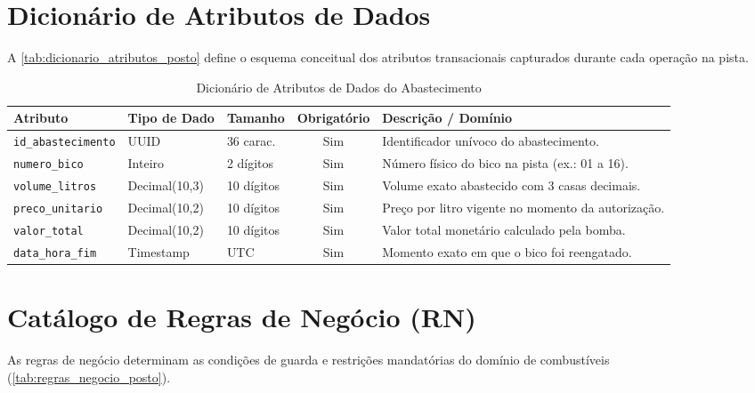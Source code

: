 \section{Dicionário de Atributos de Dados}

A \autoref{tab:dicionario_atributos_posto} define o esquema conceitual dos atributos transacionais capturados durante cada operação na pista.

\begin{table}[htbp]
\caption{Dicionário de Atributos de Dados do Abastecimento}
\label{tab:dicionario_atributos_posto}
\centering
\small
\begin{tabularx}{\textwidth}{@{} l l l c Y @{}}
\toprule
\textbf{Atributo} & \textbf{Tipo de Dado} & \textbf{Tamanho} & \textbf{Obrigatório} & \textbf{Descrição / Domínio} \\
\midrule
\texttt{id\_abastecimento} & UUID & 36 carac. & Sim & Identificador unívoco do abastecimento. \\
\texttt{numero\_bico} & Inteiro & 2 dígitos & Sim & Número físico do bico na pista (ex.: 01 a 16). \\
\texttt{volume\_litros} & Decimal(10,3) & 10 dígitos & Sim & Volume exato abastecido com 3 casas decimais. \\
\texttt{preco\_unitario} & Decimal(10,2) & 10 dígitos & Sim & Preço por litro vigente no momento da autorização. \\
\texttt{valor\_total} & Decimal(10,2) & 10 dígitos & Sim & Valor total monetário calculado pela bomba. \\
\texttt{data\_hora\_fim} & Timestamp & UTC & Sim & Momento exato em que o bico foi reengatado. \\
\bottomrule
\end{tabularx}
\end{table}

\section{Catálogo de Regras de Negócio (RN)}

As regras de negócio determinam as condições de guarda e restrições mandatórias do domínio de combustíveis (\autoref{tab:regras_negocio_posto}).

